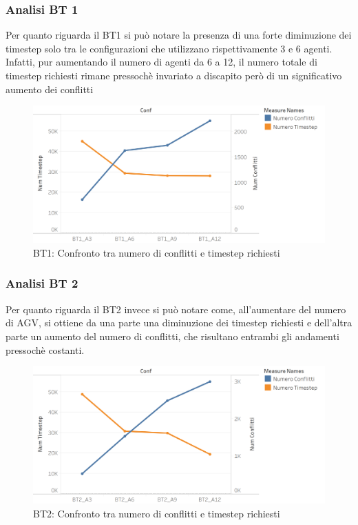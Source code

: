 \documentclass[12pt]{article}
\begin{document}
\subsubsection{Analisi BT 1}
Per quanto riguarda il BT1 si può notare la presenza di una forte diminuzione dei timestep solo tra le configurazioni che utilizzano rispettivamente 3 e 6 agenti. Infatti, pur aumentando il numero di agenti da 6 a 12, il numero totale di timestep richiesti rimane pressochè invariato a discapito però di un significativo aumento dei conflitti\\

\begin{figure}[H]
\centering
  \includegraphics[width=1\linewidth]{Figures/Results_Graphics/BT1_TimeConflicts.png}
  \caption{BT1: Confronto tra numero di conflitti e timestep richiesti}\label{fig:BT1_TimeConflicts}
\end{figure}

\subsubsection{Analisi BT 2}
Per quanto riguarda il BT2 invece si può notare come, all'aumentare del numero di AGV, si ottiene da una parte una diminuzione dei timestep richiesti e dell'altra parte un aumento del numero di conflitti, che risultano entrambi gli andamenti pressochè costanti.

\begin{figure}[H]
\centering
  \includegraphics[width=1\linewidth]{Figures/Results_Graphics/BT2_TimeConflicts.png}
  \caption{BT2: Confronto tra numero di conflitti e timestep richiesti}\label{fig:BT2_TimeConflicts}
\end{figure}
\end{document}
